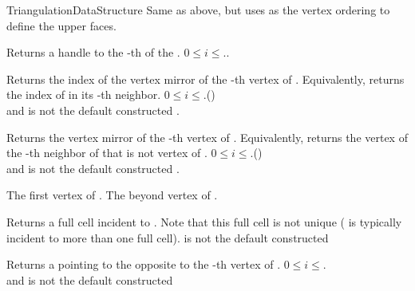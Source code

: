\begin{ccRefConcept}{TriangulationDataStructure}
\ccGlue{} {Same as above, but uses  as
 the vertex ordering to define the upper faces.}


{ Returns a handle to the -th  of the  .
\ccPrecond $0\leq i\leq$\ccVar..}

{Returns the index of the vertex mirror of the -th vertex of .
Equivalently, returns the index of  in its -th neighbor.
\ccPrecond $0\leq i\leq$\ccVar.()\\
and  is not the default constructed . }

{Returns the vertex mirror of the -th vertex of .
Equivalently, returns the vertex of the -th neighbor of 
that is not vertex of .
\ccPrecond $0\leq i\leq$\ccVar.()\\
and  is not the default constructed . }


{
The first vertex of \ccVar.
}
\ccGlue
{}
{
The beyond vertex of \ccVar.
}


{Returns a full cell incident to  . Note that this
  full cell is
not unique ( is typically incident to more than one full cell).
\ccPrecond{} is not the default constructed }

{ Returns a  pointing to the 
opposite to the -th vertex of . 
\ccPrecond$0\leq i \leq$\ccVar.\\
and  is not the default constructed }


\end{ccRefConcept}
